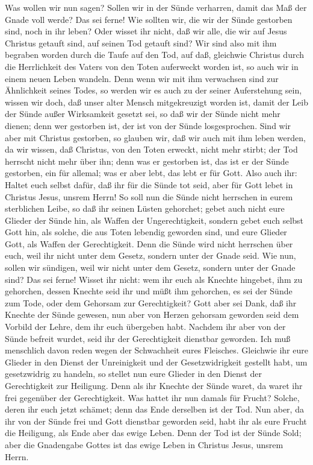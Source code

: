  Was wollen wir nun sagen? Sollen wir in der Sünde
verharren, damit das Maß der Gnade voll werde?  Das sei
ferne! Wie sollten wir, die wir der Sünde gestorben sind, noch in ihr
leben?  Oder wisset ihr nicht, daß wir alle, die wir auf
Jesus Christus getauft sind, auf seinen Tod getauft sind? 
Wir sind also mit ihm begraben worden durch die Taufe auf den Tod, auf
daß, gleichwie Christus durch die Herrlichkeit des Vaters von den Toten
auferweckt worden ist, so auch wir in einem neuen Leben wandeln.
 Denn wenn wir mit ihm verwachsen sind zur Ähnlichkeit
seines Todes, so werden wir es auch zu der seiner Auferstehung sein,
 wissen wir doch, daß unser alter Mensch mitgekreuzigt
worden ist, damit der Leib der Sünde außer Wirksamkeit gesetzt sei, so
daß wir der Sünde nicht mehr dienen;  denn wer gestorben
ist, der ist von der Sünde losgesprochen.  Sind wir aber
mit Christus gestorben, so glauben wir, daß wir auch mit ihm leben
werden,  da wir wissen, daß Christus, von den Toten
erweckt, nicht mehr stirbt; der Tod herrscht nicht mehr über ihn;
 denn was er gestorben ist, das ist er der Sünde
gestorben, ein für allemal; was er aber lebt, das lebt er für Gott.
 Also auch ihr: Haltet euch selbst dafür, daß ihr für die
Sünde tot seid, aber für Gott lebet in Christus Jesus, unsrem Herrn!
 So soll nun die Sünde nicht herrschen in eurem
sterblichen Leibe, so daß ihr seinen Lüsten gehorchet; 
gebet auch nicht eure Glieder der Sünde hin, als Waffen der
Ungerechtigkeit, sondern gebet euch selbst Gott hin, als solche, die aus
Toten lebendig geworden sind, und eure Glieder Gott, als Waffen der
Gerechtigkeit.  Denn die Sünde wird nicht herrschen über
euch, weil ihr nicht unter dem Gesetz, sondern unter der Gnade seid.
 Wie nun, sollen wir sündigen, weil wir nicht unter dem
Gesetz, sondern unter der Gnade sind? Das sei ferne! 
Wisset ihr nicht: wem ihr euch als Knechte hingebet, ihm zu gehorchen,
dessen Knechte seid ihr und müßt ihm gehorchen, es sei der Sünde zum
Tode, oder dem Gehorsam zur Gerechtigkeit?  Gott aber sei
Dank, daß ihr Knechte der Sünde gewesen, nun aber von Herzen gehorsam
geworden seid dem Vorbild der Lehre, dem ihr euch übergeben habt.
 Nachdem ihr aber von der Sünde befreit wurdet, seid ihr
der Gerechtigkeit dienstbar geworden.  Ich muß menschlich
davon reden wegen der Schwachheit eures Fleisches. Gleichwie ihr eure
Glieder in den Dienst der Unreinigkeit und der Gesetzwidrigkeit gestellt
habt, um gesetzwidrig zu handeln, so stellet nun eure Glieder in den
Dienst der Gerechtigkeit zur Heiligung.  Denn als ihr
Knechte der Sünde waret, da waret ihr frei gegenüber der Gerechtigkeit.
 Was hattet ihr nun damals für Frucht? Solche, deren ihr
euch jetzt schämet; denn das Ende derselben ist der Tod. 
Nun aber, da ihr von der Sünde frei und Gott dienstbar geworden seid,
habt ihr als eure Frucht die Heiligung, als Ende aber das ewige Leben.
 Denn der Tod ist der Sünde Sold; aber die Gnadengabe
Gottes ist das ewige Leben in Christus Jesus, unsrem Herrn.

